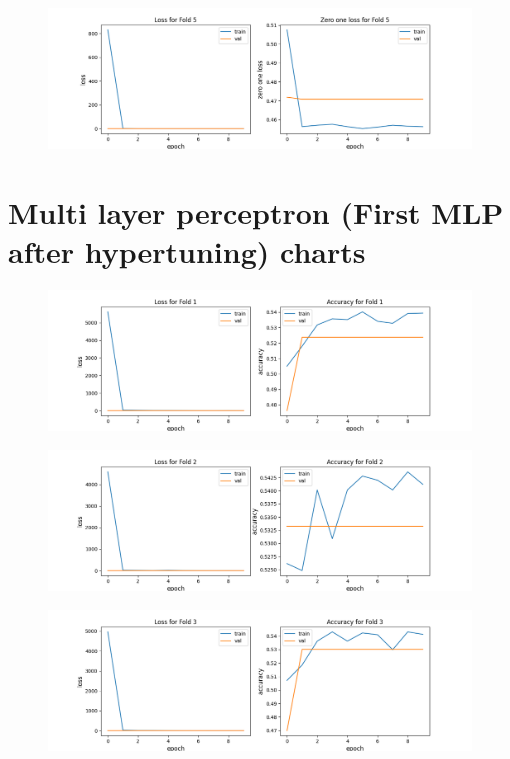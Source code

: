 \begin{appendices}
\begin{figure}[hbtp]
\centering
\includegraphics[scale=0.5]{../Images/mlp01_fold_5_zeroplot.png}
\end{figure}
\chapter{Multi layer perceptron (First MLP after hypertuning) charts}
\begin{figure}[hbtp]

\centering
\includegraphics[scale=0.5]{../Images/mlp02_fold_1_plot.png}
\end{figure}
\begin{figure}[hbtp]

\centering
\includegraphics[scale=0.5]{../Images/mlp02_fold_2_plot.png}
\end{figure}
\begin{figure}[hbtp]

\centering
\includegraphics[scale=0.5]{../Images/mlp02_fold_3_plot.png}
\end{figure}
\begin{figure}[hbtp]


\end{figure}
\end{appendices}
